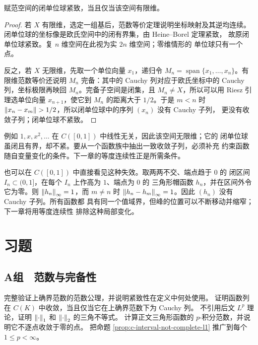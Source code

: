 \begin{theorem}
\label{thm:unit-ball-compact-iff-finite-dimensional}
赋范空间的闭单位球紧致，当且仅当该空间有限维。
\end{theorem}

\begin{proof}
若 $X$ 有限维，选定一组基后，范数等价定理说明坐标映射及其逆均连续。
闭单位球的坐标像是欧氏空间中的闭有界集，由 Heine--Borel 定理紧致，
故原闭单位球紧致。复 $n$ 维空间在此视为实 $2n$ 维空间；零维情形的
单位球只有一个点。

反之，若 $X$ 无限维，先取一个单位向量 $x_1$，递归令
$M_n=\operatorname{span}\{x_1,\ldots,x_n\}$。有限维范数等价还说明 $M_n$
完备：其中的 Cauchy 列对应于欧氏坐标中的 Cauchy 列，坐标极限再映回
$M_n$。完备子空间是闭集，且 $M_n\ne X$，所以可以用 Riesz 引理选单位向量
$x_{n+1}$，使它到 $M_n$ 的距离大于 $1/2$。于是 $m<n$ 时
$\left\lVert x_n-x_m\right\rVert>1/2$，所以闭单位球中的序列 $(x_n)$ 没有 Cauchy 子列，
更没有收敛子列；闭单位球不紧致。
\end{proof}

例如 $1,x,x^2,\ldots$ 在 $C([0,1])$ 中线性无关，因此该空间无限维；它的
闭单位球虽闭且有界，却不紧。要从一个函数族中抽出一致收敛子列，必须补充
约束函数随自变量变化的条件。下一章的等度连续性正是所需条件。

也可以在 $C([0,1])$ 中直接看见这种失效。取两两不交、端点趋于 $0$ 的
闭区间 $I_n\subset(0,1]$，在每个 $I_n$ 上作高为 $1$、端点为 $0$ 的
三角形帽函数 $h_n$，并在区间外令它为零。则
$\left\lVert h_n\right\rVert_\infty=1$，而 $m\ne n$ 时
$\left\lVert h_n-h_m\right\rVert_\infty=1$。因此 $(h_n)$ 没有 Cauchy 子列。所有函数都
具有同一个值域界，但峰的位置可以不断移动并缩窄；下一章将用等度连续性
排除这种局部变化。

\section*{习题}

\subsection*{A组　范数与完备性}
\begin{enumerate}[label=\textbf{\thechapter.\arabic*.}]
 完整验证上确界范数的范数公理，并说明紧致性在定义中何处使用。
 证明函数列在 $C(K)$ 中收敛，当且仅当它在上确界范数下为 Cauchy 列。
 不引用后文 $L^p$ 理论，证明 $\left\lVert\cdot\right\rVert_1$ 和 $\left\lVert\cdot\right\rVert_2$ 的三角不等式。
 计算正文三角形函数的 $p$-积分范数，并说明它不逐点收敛于零的点。
 把命题 \ref{prop:c-interval-not-complete-l1} 推广到每个 $1\le p<\infty$。
\end{enumerate}

